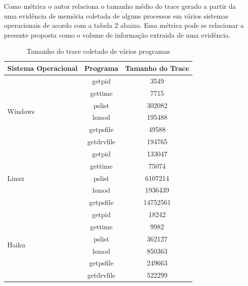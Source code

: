 \documentclass[
	12pt,				%
	openright,			%
	oneside,			%
	a4paper,			%
	english,			%
	french,				%
	spanish,			%
	brazil,				%
	]{abntex2}
\begin{document}
\begin{itemize}
Como métrica o autor relaciona o tamanho médio do trace gerado a partir da uma evidência de memória coletada de alguns processos em vários sistemas operacionais de acordo 
com a tabela 2 abaixo. Essa métrica pode se relacionar a presente proposta como o volume de informação extraida de uma evidência.

\begin{table}[]
\centering
\caption{Tamanho do trace coletado de vários programas}
\label{my-label}
\begin{tabular}{l|c|c}
\hline
\textbf{Sistema Operacional}		&\textbf{Programa}	      & \textbf{Tamanho do Trace}\\ \hline
\multirow{6}{*}{Windows}                & getpid                      & 3549			 \\
                                        & gettime                     & 7715    		 \\
                                        & pslist                      & 302082  		 \\
                                        & lsmod                       & 195488   		 \\
                                        & getpsfile                   & 49588   		 \\
                                        & getdrvfile                  & 194765  		 \\
\multirow{5}{*}{Linux}                  & getpid                      & 133047                   \\ \hline
                                        & gettime                     & 75074                    \\
                                        & pslist                      & 6107214                  \\
                                        & lsmod                       & 1936439                  \\
                                        & getpsfile                   & 14752561                 \\
\multirow{6}{*}{Haiku}                  & getpid                      & 18242                    \\ \hline
                                        & gettime                     & 9982                     \\
                                        & pslist                      & 362127                   \\
                                        & lsmod                       & 850363                   \\
                                        & getpsfile                   & 249663                   \\
                                        & getdrvfile                  & 522299                   \\ 
\end{tabular}
\end{table}


\end{itemize}
\end{document}
